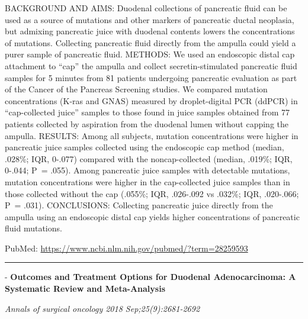 \documentclass[]{article}
\begin{document}
BACKGROUND AND AIMS: Duodenal collections of pancreatic fluid can be
used as a source of mutations and other markers of pancreatic ductal
neoplasia, but admixing pancreatic juice with duodenal contents lowers
the concentrations of mutations. Collecting pancreatic fluid directly
from the ampulla could yield a purer sample of pancreatic fluid.
METHODS: We used an endoscopic distal cap attachment to ``cap'' the
ampulla and collect secretin-stimulated pancreatic fluid samples for 5
minutes from 81 patients undergoing pancreatic evaluation as part of the
Cancer of the Pancreas Screening studies. We compared mutation
concentrations (K-ras and GNAS) measured by droplet-digital PCR (ddPCR)
in ``cap-collected juice'' samples to those found in juice samples
obtained from 77 patients collected by aspiration from the duodenal
lumen without capping the ampulla. RESULTS: Among all subjects, mutation
concentrations were higher in pancreatic juice samples collected using
the endoscopic cap method (median, .028\%; IQR, 0-.077) compared with
the noncap-collected (median, .019\%; IQR, 0-.044; P~= .055). Among
pancreatic juice samples with detectable mutations, mutation
concentrations were higher in the cap-collected juice samples than in
those collected without the cap (.055\%; IQR, .026-.092 vs .032\%; IQR,
.020-.066; P~= .031). CONCLUSIONS: Collecting pancreatic juice directly
from the ampulla using an endoscopic distal cap yields higher
concentrations of pancreatic fluid mutations.

PubMed: \url{https://www.ncbi.nlm.nih.gov/pubmed/?term=28259593}

{}

{}

\begin{center}\rule{0.5\linewidth}{\linethickness}\end{center}

 - \textbf{Outcomes and Treatment Options for Duodenal Adenocarcinoma: A
Systematic Review and Meta-Analysis}

\emph{Annals of surgical oncology 2018 Sep;25(9):2681-2692}
\end{document}
